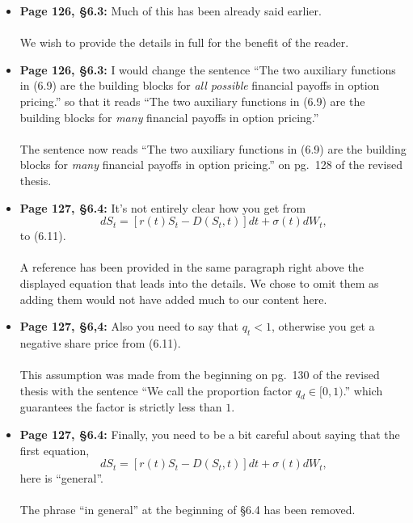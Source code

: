 \documentclass{article}
\begin{document}
\begin{enumerate}
\begin{itemize}
			\item{\textbf{Page 126, \S6.3: } Much of this has been already said earlier. 
			\\\\}
			We wish to provide the details in full for the benefit of the reader.
			
			\item{\textbf{Page 126, \S6.3: } I would change the sentence ``The two auxiliary functions in (6.9) are the building blocks for \emph{all possible} financial payoffs in option pricing.'' so that it reads ``The two auxiliary functions in (6.9) are the building blocks for \emph{many} financial payoffs in option pricing.''
			\\\\}
			The sentence now reads  ``The two auxiliary functions in (6.9) are the building blocks for \emph{many} financial payoffs in option pricing.'' on pg.~128 of the revised thesis.
			
			\item{\textbf{Page 127, \S6.4: } It's not entirely clear how you get from
				$$
					dS_t = [r(t)S_t - D(S_t,t)]dt + \sigma(t) dW_t,
				$$
				to (6.11).\\\\}
			A reference has been provided in the same paragraph right above the displayed equation that leads into the details. We chose to omit them as adding them would not have added much to our content here.
			
			\item{\textbf{Page 127, \S6,4: } Also you need to say that $q_t < 1$, otherwise you get a negative share price from (6.11). 
			\\\\}
			This assumption was made from the beginning on pg.~130 of the revised thesis with the sentence ``We call the proportion factor $q_d \in [0,1)$.'' which guarantees the factor is strictly less than $1$.
			
			\item{\textbf{Page 127, \S6.4: } Finally, you need to be a bit careful about saying that the first equation,
							$$
					dS_t = [r(t)S_t - D(S_t,t)]dt + \sigma(t) dW_t,
				$$
				here is ``general''.\\\\}
				The phrase ``in general'' at the beginning of \S6.4 has been removed.
				

\end{itemize}
\end{enumerate}
\end{document}
